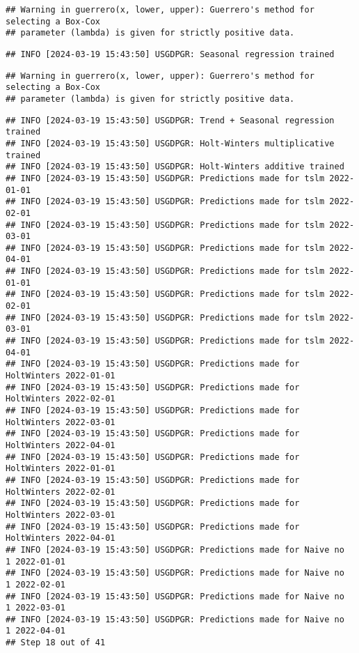 \documentclass[
]{article}
\begin{document}
\begin{verbatim}
## Warning in guerrero(x, lower, upper): Guerrero's method for selecting a Box-Cox
## parameter (lambda) is given for strictly positive data.
\end{verbatim}

\begin{verbatim}
## INFO [2024-03-19 15:43:50] USGDPGR: Seasonal regression trained
\end{verbatim}

\begin{verbatim}
## Warning in guerrero(x, lower, upper): Guerrero's method for selecting a Box-Cox
## parameter (lambda) is given for strictly positive data.
\end{verbatim}

\begin{verbatim}
## INFO [2024-03-19 15:43:50] USGDPGR: Trend + Seasonal regression trained
## INFO [2024-03-19 15:43:50] USGDPGR: Holt-Winters multiplicative trained
## INFO [2024-03-19 15:43:50] USGDPGR: Holt-Winters additive trained
## INFO [2024-03-19 15:43:50] USGDPGR: Predictions made for tslm 2022-01-01
## INFO [2024-03-19 15:43:50] USGDPGR: Predictions made for tslm 2022-02-01
## INFO [2024-03-19 15:43:50] USGDPGR: Predictions made for tslm 2022-03-01
## INFO [2024-03-19 15:43:50] USGDPGR: Predictions made for tslm 2022-04-01
## INFO [2024-03-19 15:43:50] USGDPGR: Predictions made for tslm 2022-01-01
## INFO [2024-03-19 15:43:50] USGDPGR: Predictions made for tslm 2022-02-01
## INFO [2024-03-19 15:43:50] USGDPGR: Predictions made for tslm 2022-03-01
## INFO [2024-03-19 15:43:50] USGDPGR: Predictions made for tslm 2022-04-01
## INFO [2024-03-19 15:43:50] USGDPGR: Predictions made for HoltWinters 2022-01-01
## INFO [2024-03-19 15:43:50] USGDPGR: Predictions made for HoltWinters 2022-02-01
## INFO [2024-03-19 15:43:50] USGDPGR: Predictions made for HoltWinters 2022-03-01
## INFO [2024-03-19 15:43:50] USGDPGR: Predictions made for HoltWinters 2022-04-01
## INFO [2024-03-19 15:43:50] USGDPGR: Predictions made for HoltWinters 2022-01-01
## INFO [2024-03-19 15:43:50] USGDPGR: Predictions made for HoltWinters 2022-02-01
## INFO [2024-03-19 15:43:50] USGDPGR: Predictions made for HoltWinters 2022-03-01
## INFO [2024-03-19 15:43:50] USGDPGR: Predictions made for HoltWinters 2022-04-01
## INFO [2024-03-19 15:43:50] USGDPGR: Predictions made for Naive no  1 2022-01-01
## INFO [2024-03-19 15:43:50] USGDPGR: Predictions made for Naive no  1 2022-02-01
## INFO [2024-03-19 15:43:50] USGDPGR: Predictions made for Naive no  1 2022-03-01
## INFO [2024-03-19 15:43:50] USGDPGR: Predictions made for Naive no  1 2022-04-01
## Step 18 out of 41
\end{verbatim}
\end{document}
